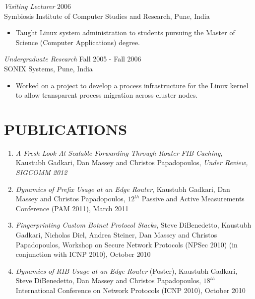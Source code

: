 \documentclass[line,margin]{res}
\begin{document}
\begin{resume}
    {\sl Visiting Lecturer} \hfill 2006\\
        Symbiosis Institute of Computer Studies and Research, Pune, India
        \begin{itemize} \itemsep -2pt
            \item Taught Linux system administration to students pursuing the Master
            of Science (Computer Applications) degree.
        \end{itemize}

    {\sl Undergraduate Research} \hfill Fall 2005 - Fall 2006\\
        SONIX Systems, Pune, India
        \begin{itemize} \itemsep -2pt
            \item Worked on a project to develop a process infrastructure for the Linux kernel to allow
            transparent process migration across cluster nodes.
        \end{itemize}
   
\section{PUBLICATIONS}
            \begin{enumerate}
              \item {\sl A Fresh Look At Scalable Forwarding Through Router FIB Caching}, Kaustubh Gadkari, Dan Massey and 
              Christos Papadopoulos, {\em Under Review, SIGCOMM 2012}
	        
              \item {\sl Dynamics of Prefix Usage at an Edge Router}, Kaustubh Gadkari, Dan Massey and Christos Papadopoulos,
              ${12^{th}}$ Passive and Active Measurements Conference (PAM 2011), March 2011 
	
         		  \item {\sl Fingerprinting Custom Botnet Protocol Stacks}, Steve DiBenedetto, Kaustubh Gadkari, Nicholas Diel,
              Andrea Steiner, Dan Massey and Christos Papadopoulos, Workshop on Secure Network Protocols (NPSec 2010) 
              (in conjunction with ICNP 2010), October 2010
          	 
              \item {\sl Dynamics of RIB Usage at an Edge Router} (Poster), Kaustubh Gadkari, Steve DiBenedetto, 
               Dan Massey and Christos Papadopoulos, ${18^{th}}$ International Conference on Network Protocols (ICNP 2010), October 2010               
             

\end{enumerate}
\end{resume}
\end{document}
